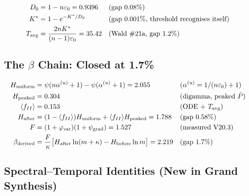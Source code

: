 \documentclass[12pt, a4paper]{article}
\begin{document}
\begin{derivedbox}[title={Core Chain from $(\varepsilon_0, n)$}]
\begin{align}
  D_0 &= 1 - n\varepsilon_0 = 0.9396 & &\text{(gap 0.08\%)}\label{eq:D0_gs}\\
  K^* &= 1 - e^{-K^*/D_0} & &\text{(gap 0.001\%, threshold recognises itself)}\label{eq:Kstar_gs}\\
  T_{\rm avg} &= \frac{2nK^*}{(n-1)\varepsilon_0} = 35.42 & &\text{(Wald \#21a, gap 1.2\%)}\label{eq:Tavg_gs}
\end{align}
\end{derivedbox}

\subsection{The $\beta$ Chain: Closed at 1.7\%}

\begin{derivedbox}[title={$\beta$ Chain (\#21 Closed at 1.7\%)}]
\begin{align}
  H_{\rm uniform} &= \psi(n\alpha^{(u)}+1) - \psi(\alpha^{(u)}+1) = 2.055
    & &(\alpha^{(u)} = 1/(n\varepsilon_0)+1)\\
  H_{\rm peaked} &= 0.304 & &\text{(digamma, peaked $\bar{P}$)}\\
  \langle f_{II}\rangle &= 0.153 & &\text{(ODE + }T_{\rm avg}\text{)}\\
  H_{\rm after} &= (1-\langle f_{II}\rangle)H_{\rm uniform} + \langle f_{II}\rangle H_{\rm peaked} = 1.788 & &\text{(gap 0.58\%)}\\
  F &= (1+\varphi_{\rm var})(1+\psi_{\rm grad}) = 1.527 & &\text{(measured V20.3)}\\
  \beta_{\rm derived} &= \frac{F}{\kappa}\bigl[H_{\rm after}\ln(m+\kappa)-H_{\rm before}\ln m\bigr] = 2.219 & &\text{(gap 1.7\%)}
\end{align}
\end{derivedbox}

\subsection{Spectral--Temporal Identities (New in Grand Synthesis)}
\end{document}
